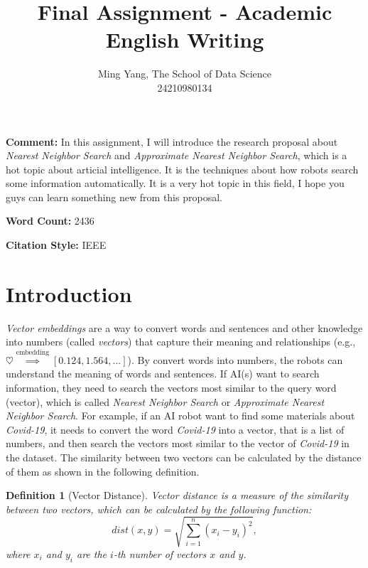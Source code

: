 \documentclass[UTF8]{article}
\title{Final Assignment - Academic English Writing}
\author{Ming Yang, The School of Data Science\\ \small{24210980134}}
\date{}
\begin{document}
	
\maketitle

\newtheorem{definition}{Definition}
\newtheorem{example}{Example}
\newtheorem{theorem}{Theorem}

\setcounter{page}{2}

\begin{tcolorbox}
  \textbf{Comment: } In this assignment, I will introduce the research proposal about 
  \textit{Nearest Neighbor Search} and \textit{Approximate Nearest Neighbor Search}, 
  which is a hot topic about articial intelligence. It is the techniques about how robots
  search some information automatically.
  It is a very hot topic in this field, I hope you guys can learn something new from this proposal.

  \textbf{Word Count: } 2436 

  \textbf{Citation Style: } IEEE
\end{tcolorbox}

\section{Introduction}
\textit{Vector embeddings} are a way to convert words and sentences and other knowledge into numbers (called \textit{vectors}) that 
capture their meaning and relationships (e.g., $\heartsuit \overset{\text{embedding}}{\implies} [0.124, 1.564, ...]$).
By convert words into numbers, the robots can understand the meaning of words and sentences. 
If AI(s) want to search information, they need to search the vectors most similar to the query word (vector), 
which is called \textit{Nearest Neighbor Search} or \textit{Approximate Nearest Neighbor Search}. For example, 
if an AI robot want to find some materials about \textit{Covid-19}, it needs to convert the word \textit{Covid-19} into a vector, 
that is a list of numbers, and then search the vectors most similar to the vector of \textit{Covid-19} in the dataset.
The similarity between two vectors can be calculated by the distance of them as shown in the following definition.

\begin{definition}[Vector Distance]
  Vector distance is a measure of the similarity between two vectors, which can be 
  calculated by the following function:
  $$
  dist(x, y) = \sqrt{\sum_{i=1}^{n}(x_i - y_i)^2},
  $$
  where $x_i$ and $y_i$ are the $i$-th number of vectors $x$ and $y$.
\end{definition}
\end{document}
